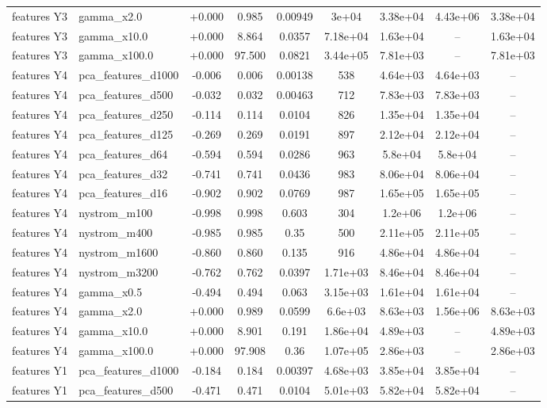 \begin{tabular}{llccccccc}
features Y3 & gamma\_x2.0 & +0.000 & 0.985 & 0.00949 & 3e+04 & 3.38e+04 & 4.43e+06 & 3.38e+04 \\
features Y3 & gamma\_x10.0 & +0.000 & 8.864 & 0.0357 & 7.18e+04 & 1.63e+04 & -- & 1.63e+04 \\
features Y3 & gamma\_x100.0 & +0.000 & 97.500 & 0.0821 & 3.44e+05 & 7.81e+03 & -- & 7.81e+03 \\
features Y4 & pca\_features\_d1000 & -0.006 & 0.006 & 0.00138 & 538 & 4.64e+03 & 4.64e+03 & -- \\
features Y4 & pca\_features\_d500 & -0.032 & 0.032 & 0.00463 & 712 & 7.83e+03 & 7.83e+03 & -- \\
features Y4 & pca\_features\_d250 & -0.114 & 0.114 & 0.0104 & 826 & 1.35e+04 & 1.35e+04 & -- \\
features Y4 & pca\_features\_d125 & -0.269 & 0.269 & 0.0191 & 897 & 2.12e+04 & 2.12e+04 & -- \\
features Y4 & pca\_features\_d64 & -0.594 & 0.594 & 0.0286 & 963 & 5.8e+04 & 5.8e+04 & -- \\
features Y4 & pca\_features\_d32 & -0.741 & 0.741 & 0.0436 & 983 & 8.06e+04 & 8.06e+04 & -- \\
features Y4 & pca\_features\_d16 & -0.902 & 0.902 & 0.0769 & 987 & 1.65e+05 & 1.65e+05 & -- \\
features Y4 & nystrom\_m100 & -0.998 & 0.998 & 0.603 & 304 & 1.2e+06 & 1.2e+06 & -- \\
features Y4 & nystrom\_m400 & -0.985 & 0.985 & 0.35 & 500 & 2.11e+05 & 2.11e+05 & -- \\
features Y4 & nystrom\_m1600 & -0.860 & 0.860 & 0.135 & 916 & 4.86e+04 & 4.86e+04 & -- \\
features Y4 & nystrom\_m3200 & -0.762 & 0.762 & 0.0397 & 1.71e+03 & 8.46e+04 & 8.46e+04 & -- \\
features Y4 & gamma\_x0.5 & -0.494 & 0.494 & 0.063 & 3.15e+03 & 1.61e+04 & 1.61e+04 & -- \\
features Y4 & gamma\_x2.0 & +0.000 & 0.989 & 0.0599 & 6.6e+03 & 8.63e+03 & 1.56e+06 & 8.63e+03 \\
features Y4 & gamma\_x10.0 & +0.000 & 8.901 & 0.191 & 1.86e+04 & 4.89e+03 & -- & 4.89e+03 \\
features Y4 & gamma\_x100.0 & +0.000 & 97.908 & 0.36 & 1.07e+05 & 2.86e+03 & -- & 2.86e+03 \\
features Y1 & pca\_features\_d1000 & -0.184 & 0.184 & 0.00397 & 4.68e+03 & 3.85e+04 & 3.85e+04 & -- \\
features Y1 & pca\_features\_d500 & -0.471 & 0.471 & 0.0104 & 5.01e+03 & 5.82e+04 & 5.82e+04 & -- \\

\end{tabular}
